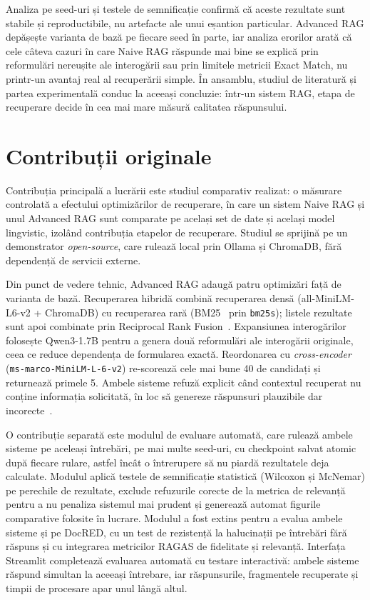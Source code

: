 Analiza pe seed-uri și testele de semnificație confirmă că aceste rezultate sunt stabile și reproductibile, nu artefacte ale unui eșantion particular. Advanced RAG depășește varianta de bază pe fiecare seed în parte, iar analiza erorilor arată că cele câteva cazuri în care Naive RAG răspunde mai bine se explică prin reformulări nereușite ale interogării sau prin limitele metricii Exact Match, nu printr-un avantaj real al recuperării simple. În ansamblu, studiul de literatură și partea experimentală conduc la aceeași concluzie: într-un sistem RAG, etapa de recuperare decide în cea mai mare măsură calitatea răspunsului.

\section*{Contribuții originale}

Contribuția principală a lucrării este studiul comparativ realizat: o măsurare controlată a efectului optimizărilor de recuperare, în care un sistem Naive RAG și unul Advanced RAG sunt comparate pe același set de date și același model lingvistic, izolând contribuția etapelor de recuperare. Studiul se sprijină pe un demonstrator \textit{open-source}, care rulează local prin Ollama și ChromaDB, fără dependență de servicii externe.

Din punct de vedere tehnic, Advanced RAG adaugă patru optimizări față de varianta de bază. Recuperarea hibridă combină recuperarea densă (all-MiniLM-L6-v2 + ChromaDB) cu recuperarea rară (BM25~\cite{robertson2009bm25} prin \texttt{bm25s}); listele rezultate sunt apoi combinate prin Reciprocal Rank Fusion~\cite{cormack2009rrf}. Expansiunea interogărilor folosește Qwen3-1.7B pentru a genera două reformulări ale interogării originale, ceea ce reduce dependența de formularea exactă. Reordonarea cu \textit{cross-encoder} (\texttt{ms-marco-MiniLM-L-6-v2}) re-scorează cele mai bune 40 de candidați și returnează primele 5. Ambele sisteme refuză explicit când contextul recuperat nu conține informația solicitată, în loc să genereze răspunsuri plauzibile dar incorecte~\cite{asai2023self}.

O contribuție separată este modulul de evaluare automată, care rulează ambele sisteme pe aceleași întrebări, pe mai multe seed-uri, cu checkpoint salvat atomic după fiecare rulare, astfel încât o întrerupere să nu piardă rezultatele deja calculate. Modulul aplică testele de semnificație statistică (Wilcoxon și McNemar) pe perechile de rezultate, exclude refuzurile corecte de la metrica de relevanță pentru a nu penaliza sistemul mai prudent și generează automat figurile comparative folosite în lucrare. Modulul a fost extins pentru a evalua ambele sisteme și pe DocRED, cu un test de rezistență la halucinații pe întrebări fără răspuns și cu integrarea metricilor RAGAS de fidelitate și relevanță. Interfața Streamlit completează evaluarea automată cu testare interactivă: ambele sisteme răspund simultan la aceeași întrebare, iar răspunsurile, fragmentele recuperate și timpii de procesare apar unul lângă altul.

